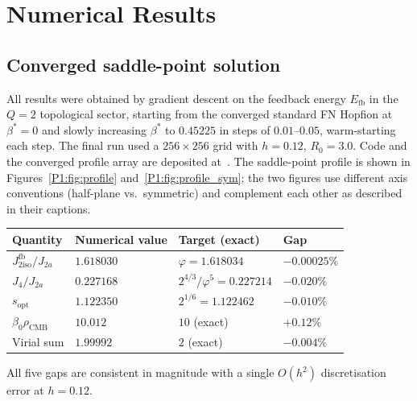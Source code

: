 \documentclass[11pt,a4paper]{article}
\theoremstyle{definition}
\theoremstyle{remark}
\newcommand{\vp}{\varphi}
\newcommand{\bz}{\beta_{0}}
\newcommand{\bst}{\beta^{*}}
\newcommand{\Efb}{E_{\mathrm{fb}}}
\newcommand{\Jfb}{J_{2\mathrm{iso}}^{\mathrm{fb}}}
\newcommand{\Ja}{J_{2a}}
\newcommand{\sopt}{s_{\mathrm{opt}}}
\newcommand{\rCMB}{\rho_{\mathrm{CMB}}}
\begin{document}
\section{Numerical Results}
\label{P1:sec:numerics}

\subsection{Converged saddle-point solution}

All results were obtained by gradient descent on the feedback energy
$\Efb$ in the $Q=2$ topological sector, starting from the converged
standard FN Hopfion at $\bst=0$ and slowly increasing $\bst$ to $0.45225$
in steps of $0.01$--$0.05$, warm-starting each step.  The final run used a
$256\times256$ grid with $h=0.12$, $R_0=3.0$.  Code and the converged
profile array are deposited at~\cite{Code2026}.
The saddle-point profile is shown in Figures~\ref{P1:fig:profile}
and~\ref{P1:fig:profile_sym}; the two figures use different axis conventions
(half-plane vs.\ symmetric) and complement each other as described in their
captions.

\begin{center}
\begin{tabular}{llll}
\toprule
Quantity & Numerical value & Target (exact) & Gap \\
\midrule
$\Jfb/\Ja$ & $1.618030$ & $\vp = 1.618034$ & $-0.00025\%$ \\
$J_4/J_{2a}$ & $0.227168$ & $2^{4/3}/\vp^5 = 0.227214$ & $-0.020\%$ \\
$\sopt$ & $1.122350$ & $2^{1/6} = 1.122462$ & $-0.010\%$ \\
$\bz\rCMB$ & $10.012$ & $10$ (exact) & $+0.12\%$ \\
Virial sum & $1.99992$ & $2$ (exact) & $-0.004\%$ \\
\bottomrule
\end{tabular}
\end{center}

All five gaps are consistent in magnitude with a single $O(h^2)$
discretisation error at $h=0.12$.
\end{document}
